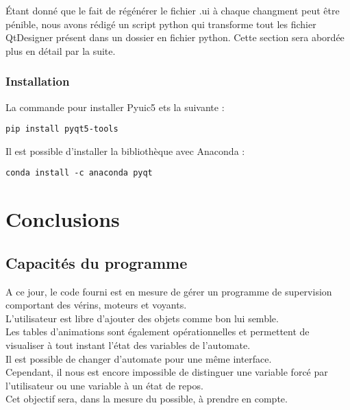 \documentclass[12pt]{report}    %
\begin{document}
Étant donné que le fait de régénérer le fichier .ui à chaque changment peut être pénible, nous avons rédigé un script python qui transforme tout les fichier QtDesigner présent dans un dossier en fichier python. \newline
Cette section sera abordée plus en détail par la suite.

\subsection{Installation}

La commande pour installer Pyuic5 ets la suivante : \newline

\begin{lstlisting}
pip install pyqt5-tools
\end{lstlisting}
Il est possible d'installer la bibliothèque avec Anaconda : \newline
\begin{lstlisting}
conda install -c anaconda pyqt
\end{lstlisting}




\chapter{Conclusions}

\section{Capacités du programme}

A ce jour, le code fourni est en mesure de gérer un programme de supervision comportant des vérins, moteurs et voyants. \\
L'utilisateur est libre d'ajouter des objets comme bon lui semble. \\

Les tables d'animations sont également opérationnelles et permettent de visualiser à tout instant l'état des variables de l'automate. \\
Il est possible de changer d'automate pour une même interface. \\
Cependant, il nous est encore impossible de distinguer une variable forcé par l'utilisateur ou une variable à un état de repos. \\
Cet objectif sera, dans la mesure du possible, à prendre en compte. \\
\end{document}
